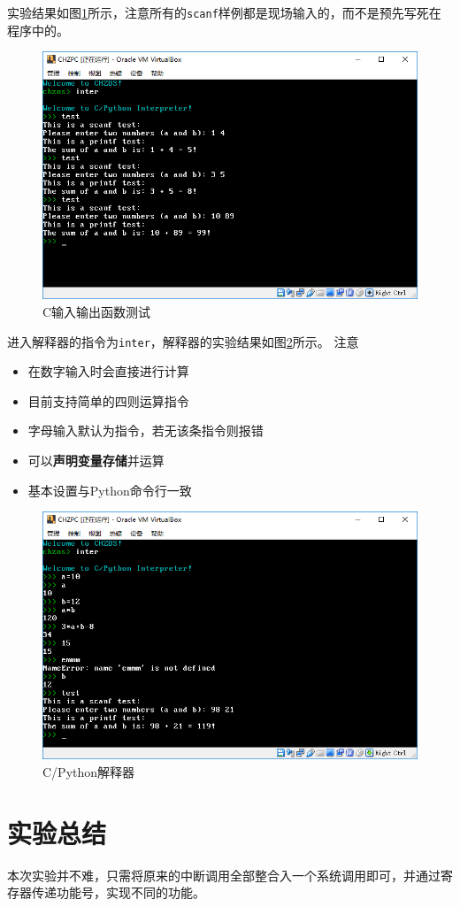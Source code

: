 \documentclass[logo,reportComp]{thesis}
\begin{document}
实验结果如图\ref{fig:io}所示，注意所有的\verb'scanf'样例都是现场输入的，而不是预先写死在程序中的。
\begin{figure}[H]
\centering
\includegraphics[width=0.8\linewidth]{fig/io.PNG}
\caption{C输入输出函数测试}
\label{fig:io}
\end{figure}

进入解释器的指令为\verb'inter'，解释器的实验结果如图\ref{fig:interpreter}所示。
注意
\begin{itemize}
	\item 在数字输入时会直接进行计算
	\item 目前支持简单的四则运算指令
	\item 字母输入默认为指令，若无该条指令则报错
	\item 可以\textbf{声明变量存储}并运算
	\item 基本设置与Python命令行一致
\end{itemize}
\begin{figure}[H]
\centering
\includegraphics[width=0.8\linewidth]{fig/interpreter.PNG}
\caption{C/Python解释器}
\label{fig:interpreter}
\end{figure}

\section{实验总结}
本次实验并不难，只需将原来的中断调用全部整合入一个系统调用即可，并通过寄存器传递功能号，实现不同的功能。
\end{document}
